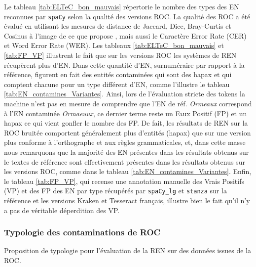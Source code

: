 Le tableau \ref{tab:ELTeC_bon_mauvais} répertorie le nombre des types des EN reconnues par \texttt{spaCy} selon la qualité des versions ROC. La qualité des ROC a été évalué en utilisant les mesures de distance de Jaccard, Dice, Bray-Curtis et Cosinus à l'image de ce que propose \cite{DBLP:conf/gis/Koudoro-Parfait21}, mais aussi le Caractère Error Rate (CER) et Word Error Rate (WER).
Les tableaux \ref{tab:ELTeC_bon_mauvais} et \ref{tab:FP_VP} illustrent le fait que sur les versions ROC les systèmes de REN récupèrent plus d'EN. Dans cette quantité d'EN, surnuméraire par rapport à la référence, figurent en fait des entités contaminées qui sont des hapax et qui comptent chacune pour un type différent d'EN, comme l'illustre le tableau \ref{tab:EN_contamines_Variantes}. Ainsi, lors de l'évaluation stricte des tokens la machine n'est pas en mesure de comprendre que l'EN de réf. \textit{Ormeaux} correspond à l'EN contaminée \textit{Ormaeuux}, ce dernier terme reste un Faux Positif (FP) et un hapax ce qui vient gonfler le nombre des FP. De fait, les résultats de REN sur la ROC bruitée comportent généralement plus d'entités (hapax) que sur une version plus conforme à l'orthographe et aux règles grammaticales, et, dans cette masse nous remarquons que la majorité des EN présentes dans les résultats obtenus sur le textes de référence sont effectivement présentes dans les résultats obtenus sur les versions ROC, comme dans le tableau \ref{tab:EN_contamines_Variantes}. Enfin, le tableau \ref{tab:FP_VP}, qui recense une annotation manuelle des Vrais Positifs (VP) et des FP des EN par type récupérés par \texttt{spaCy\_lg} et \texttt{stanza} sur la référence et les versions Kraken et Tesseract français, illustre bien le fait qu'il n'y a pas de véritable déperdition des VP.


\subsubsection{Typologie des contaminations de ROC}
\label{subsec:typologie-OCR}
\begin{table}[h!]
\small
    \centering
   
    \caption{Proposition de typologie pour l'évaluation de la REN sur des données issues de la ROC.}
    \label{tab:typo_erreurs_ocr}
\end{table}

